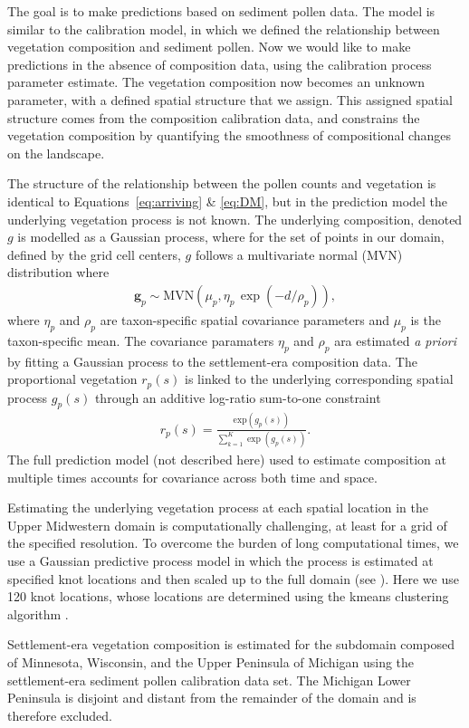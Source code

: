 \documentclass[12pt]{article}
\begin{document}
The goal is to make predictions based on sediment pollen data. The
model is similar to the calibration model, in which we defined the
relationship between vegetation composition and sediment pollen. Now
we would like to make predictions in the absence of composition data,
using the calibration process parameter estimate. The vegetation
composition now becomes an unknown parameter, with a defined spatial
structure that we assign. This assigned spatial structure comes from
the composition calibration data, and constrains the vegetation
composition by quantifying the smoothness of compositional changes on
the landscape. 

The structure of the relationship between the pollen counts and
vegetation is identical to Equations~\ref{eq:arriving} \& \ref{eq:DM},
but in the prediction model the underlying vegetation process is not
known. The underlying composition, denoted $g$ is modelled as a
Gaussian process, where for the set of points in our domain, defined
by the grid cell centers, $g$ follows a multivariate normal (MVN)
distribution where
\begin{align*}
\bm{g}_p \sim \text{MVN}(\mu_p, \eta_p \, \exp(-d/\rho_p)),
\end{align*}
where $\eta_p$ and $\rho_p$ are taxon-specific spatial covariance
parameters and $\mu_p$ is the taxon-specific mean.  The covariance
paramaters $\eta_p$ and $\rho_p$ ara estimated \textit{a priori} by
fitting a Gaussian process to the settlement-era composition data.
The proportional vegetation $r_p(s)$ is linked to the underlying
corresponding spatial process $g_p(s)$ through an additive log-ratio
sum-to-one constraint
\begin{align*}
r_p(s) = \frac{ \text{exp}(g_p(s))}{ \sum_{k=1}^K \exp (g_p(s)) }.
\end{align*} 
The full prediction model (not described here) used to estimate
composition at multiple times accounts for covariance across both time
and space. 

Estimating the underlying vegetation process at each spatial location
in the Upper Midwestern domain is computationally challenging, at
least for a grid of the specified resolution. To overcome the burden
of long computational times, we use a Gaussian predictive process
model in which the process is estimated at specified knot locations
and then scaled up to the full domain (see \cite{XXX}). Here we use
120 knot locations, whose locations are determined using the kmeans
clustering algorithm \cite{XXX}.

Settlement-era vegetation composition is estimated for the subdomain
composed of Minnesota, Wisconsin, and the Upper Peninsula of Michigan
using the settlement-era sediment pollen calibration data set. The
Michigan Lower Peninsula is disjoint and distant from the remainder of
the domain and is therefore excluded. 
\end{document}
